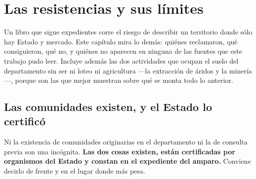 \chapter{Las resistencias y sus límites}

\label{cap:resistencias}
Un libro que sigue expedientes corre el riesgo de describir un territorio donde sólo hay
Estado y mercado. Este capítulo mira lo demás: quiénes reclamaron, qué consiguieron, qué
no, y quiénes no aparecen en ninguna de las fuentes que este trabajo pudo leer. Incluye
además las dos actividades que ocupan el suelo del departamento sin ser ni loteo ni
agricultura —la extracción de áridos y la minería—, porque son las que mejor muestran
sobre qué se monta todo lo anterior.

\section{Las comunidades existen, y el Estado lo certificó}

Ni la existencia de comunidades
originarias en el departamento ni la de consulta previa son una incógnita. \textbf{Las dos cosas existen, están
certificadas por organismos del Estado y constan en el expediente del amparo.} Conviene
decirlo de frente y en el lugar donde más pesa.

